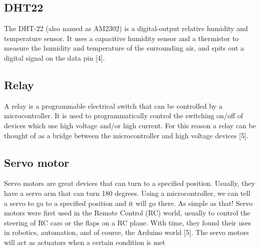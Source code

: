 \documentclass[conference]{IEEEtran}
\begin{document}
\subsection{DHT22}
The DHT-22 (also named as AM2302) is a digital-output relative humidity and temperature
sensor. It uses a capacitive humidity sensor and a thermistor to measure the humidity and
temperature of the surrounding air, and spits out a digital signal on the data pin [4].
\subsection{Relay}
A relay is a programmable electrical switch that can be controlled by a microcontroller. It is
used to programmatically control the switching on/off of devices which use high voltage and/or
high current. For this reason a relay can be thought of as a bridge between the microcontroller
and high voltage devices [5].
\subsection{Servo motor}
Servo motors are great devices that can turn to a specified position. Usually, they have a servo
arm that can turn 180 degrees. Using a microcontroller, we can tell a servo to go to a specified
position and it will go there. As simple as that! Servo motors were first used in the Remote
Control (RC) world, usually to control the steering of RC cars or the flaps on a RC plane. With
time, they found their uses in robotics, automation, and of course, the Arduino world [5]. The
servo motors will act as actuators when a certain condition is met
\end{document}
